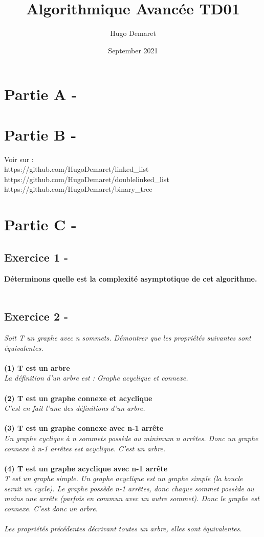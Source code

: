 \documentclass{article}
\title{Algorithmique Avancée TD01}
\author{Hugo Demaret}
\date{September 2021}
\begin{document}
\maketitle
\section*{Partie A -}
\section*{Partie B -}
Voir sur :\\
	https://github.com/HugoDemaret/linked\_list\\
	https://github.com/HugoDemaret/doublelinked\_list\\
	https://github.com/HugoDemaret/binary\_tree\\

\section*{Partie C -}
\subsection*{Exercice 1 -}
	\textbf{Déterminons quelle est la complexité asymptotique de cet algorithme.}\\\\
\subsection*{Exercice 2 -}
	\textit{Soit T un graphe avec n sommets. Démontrer que les propriétés suivantes sont équivalentes.}\\\\
	\textbf{(1) T est un arbre}\\
	\textit{La définition d'un arbre est : Graphe acyclique et connexe.}\\\\
	\textbf{(2) T est un graphe connexe et acyclique}\\
	\textit{C'est en fait l'une des définitions d'un arbre.}\\\\
	\textbf{(3) T est un graphe connexe avec n-1 arrête}\\
	\textit{Un graphe cyclique à n sommets possède au minimum n arrêtes. Donc un graphe connexe à n-1 		arrêtes est acyclique. C'est un arbre.}\\\\
	\textbf{(4) T est un graphe acyclique avec n-1 arrête}\\
	\textit{T est un graphe simple. Un graphe acyclique est un graphe simple (la boucle serait un cycle). Le graphe possède n-1 arrêtes, donc chaque sommet possède au moins une arrête (parfois en commun avec un autre sommet). Donc le graphe est connexe. C'est donc un arbre.}\\\\
\textit{Les propriétés précédentes décrivant toutes un arbre, elles sont équivalentes.}\\\\
\end{document}
